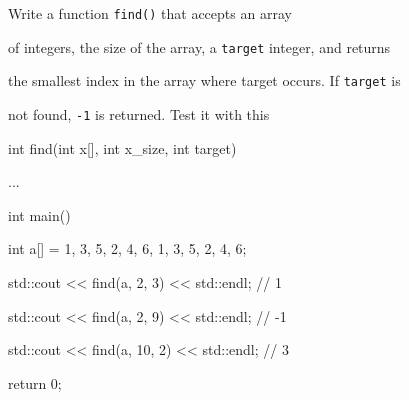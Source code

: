 Write a function \texttt{find()} that accepts an array

of integers, the size of the array, a \texttt{target} integer, and returns

the smallest index in the array where target occurs. If \texttt{target} is

not found, \texttt{-1} is returned. Test it with this



\begin{consolethree}[escapeinside=||]

int find(int x[], int x\_size, int target)

{

    ...

}



int main()

{

    int a[] = {1, 3, 5, 2, 4, 6, 1, 3, 5, 2, 4, 6};

    std::cout << find(a, 2, 3) << std::endl; // 1

    std::cout << find(a, 2, 9) << std::endl; // -1

    std::cout << find(a, 10, 2) << std::endl; // 3

    return 0;

}

\end{consolethree}

